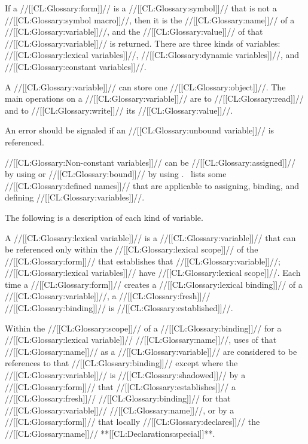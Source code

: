 If a //[[CL:Glossary:form]]// is a //[[CL:Glossary:symbol]]// that is not a //[[CL:Glossary:symbol macro]]//,
then it is the //[[CL:Glossary:name]]// of a //[[CL:Glossary:variable]]//, and the //[[CL:Glossary:value]]// of that
//[[CL:Glossary:variable]]// is returned. There are three kinds of variables:
 //[[CL:Glossary:lexical variables]]//,
 //[[CL:Glossary:dynamic variables]]//,
and
 //[[CL:Glossary:constant variables]]//.

A //[[CL:Glossary:variable]]// can store one //[[CL:Glossary:object]]//.
The main operations on a //[[CL:Glossary:variable]]// are 
 to //[[CL:Glossary:read]]// and 
 to //[[CL:Glossary:write]]//
its //[[CL:Glossary:value]]//.





An error  should be signaled if
an //[[CL:Glossary:unbound variable]]// is referenced.

//[[CL:Glossary:Non-constant variables]]// can be //[[CL:Glossary:assigned]]// by using  
or //[[CL:Glossary:bound]]// by using .
\Thenextfigure\ lists some //[[CL:Glossary:defined names]]// that
are applicable to assigning, binding, and defining //[[CL:Glossary:variables]]//.


The following is a description of each kind of variable.












A //[[CL:Glossary:lexical variable]]// is a //[[CL:Glossary:variable]]// that can be referenced only within 
the //[[CL:Glossary:lexical scope]]// of the //[[CL:Glossary:form]]// that establishes that //[[CL:Glossary:variable]]//;
//[[CL:Glossary:lexical variables]]// have //[[CL:Glossary:lexical scope]]//.
Each time a //[[CL:Glossary:form]]// creates a //[[CL:Glossary:lexical binding]]// of a //[[CL:Glossary:variable]]//,
a //[[CL:Glossary:fresh]]// //[[CL:Glossary:binding]]// is //[[CL:Glossary:established]]//.

Within the //[[CL:Glossary:scope]]// of a //[[CL:Glossary:binding]]// for a //[[CL:Glossary:lexical variable]]// //[[CL:Glossary:name]]//,
uses of that //[[CL:Glossary:name]]// as a //[[CL:Glossary:variable]]// are considered to be references
to that //[[CL:Glossary:binding]]// except where the //[[CL:Glossary:variable]]// is //[[CL:Glossary:shadowed]]// 
by a //[[CL:Glossary:form]]// that //[[CL:Glossary:establishes]]// a //[[CL:Glossary:fresh]]// //[[CL:Glossary:binding]]// for that 
//[[CL:Glossary:variable]]// //[[CL:Glossary:name]]//,
or by a //[[CL:Glossary:form]]// that locally //[[CL:Glossary:declares]]// the //[[CL:Glossary:name]]// **[[CL:Declarations:special]]**.

